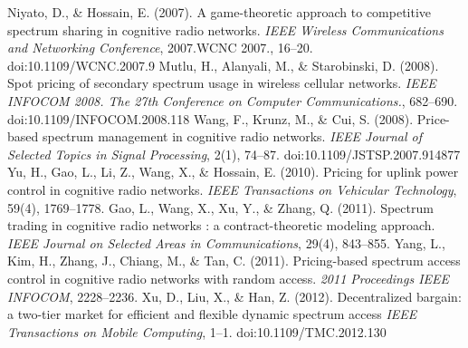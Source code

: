 \begin{thebibliography}{}
 Niyato, D., \& Hossain, E. (2007). A game-theoretic approach to competitive spectrum sharing in cognitive radio networks. \textit{IEEE Wireless Communications and Networking Conference}, 2007.WCNC 2007., 16–20. doi:10.1109/WCNC.2007.9
 Mutlu, H., Alanyali, M., \& Starobinski, D. (2008). Spot pricing of secondary spectrum usage in wireless cellular networks. \textit{IEEE INFOCOM 2008. The 27th Conference on Computer Communications.}, 682–690. doi:10.1109/INFOCOM.2008.118
 Wang, F., Krunz, M., \& Cui, S. (2008). Price-based spectrum management in cognitive radio networks. \textit{IEEE Journal of Selected Topics in Signal Processing}, 2(1), 74–87. doi:10.1109/JSTSP.2007.914877
 Yu, H., Gao, L., Li, Z., Wang, X., \& Hossain, E. (2010). Pricing for uplink power control in cognitive radio networks. \textit{IEEE Transactions on Vehicular Technology}, 59(4), 1769–1778.
  Gao, L., Wang, X., Xu, Y., \& Zhang, Q. (2011). Spectrum trading in cognitive radio networks : a contract-theoretic modeling approach. \textit{IEEE Journal on Selected Areas in Communications}, 29(4), 843–855.
 Yang, L., Kim, H., Zhang, J., Chiang, M., \& Tan, C. (2011). Pricing-based spectrum access control in cognitive radio networks with random access. \textit{2011 Proceedings IEEE INFOCOM}, 2228–2236.
 Xu, D., Liu, X., \& Han, Z. (2012). Decentralized bargain: a two-tier market for efficient and flexible dynamic spectrum access \textit{IEEE Transactions on Mobile Computing}, 1–1. doi:10.1109/TMC.2012.130


\end{thebibliography}
